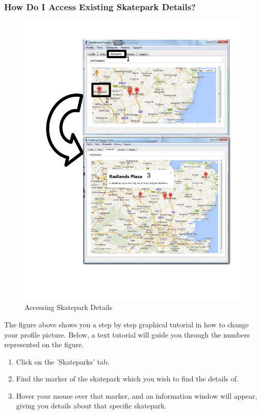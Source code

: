 \subsubsection{How Do I Access Existing Skatepark Details?}\label{SkateparkDetails}

\begin{figure}[H]
    \includegraphics[width=\textwidth]{./Manual/Images/SkateparkDetails.pdf}
    \caption{Accessing Skatepark Details} \label{fig:Skatepark Details}
\end{figure}

The figure above shows you a step by step graphical tutorial in how to change your profile picture. Below, a text tutorial will guide you through the numbers represented on the figure.

\begin{enumerate}
\item Click on the 'Skateparks' tab.
\item Find the marker of the skatepark which you wish to find the details of.
\item Hover your mouse over that marker, and an information window will appear, giving you details about that specific skatepark.
\end{enumerate}

